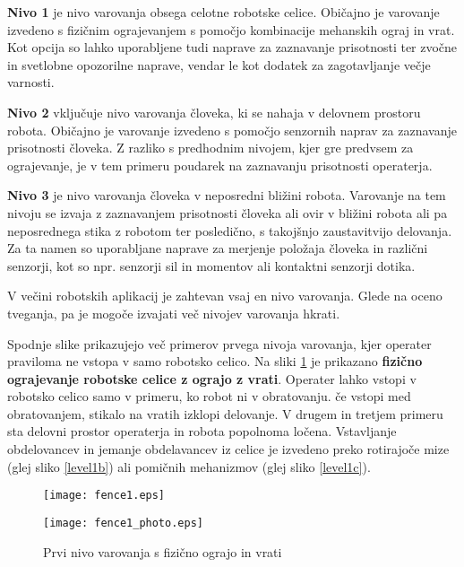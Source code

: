 \begin{description}
       \item \textbf{Nivo 1} je nivo varovanja obsega celotne robotske
       celice. Običajno je varovanje izvedeno s fizičnim
       ograjevanjem s pomočjo kombinacije mehanskih ograj in vrat.
       Kot opcija so lahko uporabljene tudi naprave za zaznavanje prisotnosti
       ter zvočne in svetlobne opozorilne naprave, vendar le kot dodatek za zagotavljanje večje varnosti.
       \item \textbf{Nivo 2} vključuje nivo varovanja človeka, ki
       se nahaja v delovnem prostoru robota. Običajno je varovanje
       izvedeno s pomočjo senzornih naprav za zaznavanje
       prisotnosti človeka. Z razliko s predhodnim nivojem, kjer gre predvsem
       za ograjevanje, je v tem primeru poudarek na zaznavanju prisotnosti operaterja.
       \item \textbf{Nivo 3} je nivo varovanja človeka v
       neposredni bližini robota. Varovanje na tem nivoju se
       izvaja z zaznavanjem prisotnosti človeka ali ovir v bližini
       robota ali pa neposrednega stika z robotom ter posledično, s takojšnjo
       zaustavitvijo delovanja. Za ta namen so uporabljane naprave
       za merjenje položaja človeka in različni senzorji, kot so
       npr. senzorji sil in momentov ali kontaktni senzorji dotika.
\end{description}
V večini robotskih aplikacij je zahtevan vsaj en nivo varovanja.
Glede na oceno tveganja, pa je mogoče izvajati več nivojev
varovanja hkrati.

Spodnje slike prikazujejo več primerov prvega nivoja varovanja,
kjer operater praviloma ne vstopa v samo robotsko celico. Na sliki
\ref{level1a} je prikazano \textbf{fizično ograjevanje robotske
celice z ograjo z vrati}. Operater lahko vstopi v robotsko celico
samo v primeru, ko robot ni v obratovanju. če vstopi med
obratovanjem, stikalo na vratih izklopi delovanje. V drugem in
tretjem primeru sta delovni prostor operaterja in robota popolnoma
ločena. Vstavljanje obdelovancev in jemanje obdelavancev iz celice
je izvedeno preko rotirajoče mize (glej sliko \ref{level1b}) ali
pomičnih mehanizmov (glej sliko \ref{level1c}).
\begin{figure}[h]
\begin{minipage}[c]{0.5\columnwidth}
\centering
\texttt{[image: fence1.eps]}
\end{minipage}
\begin{minipage}[c]{0.5\columnwidth}
\centering
\texttt{[image: fence1\_photo.eps]}
\end{minipage}
\caption{\label{level1a}Prvi nivo varovanja s fizično ograjo in
vrati}
\end{figure}

